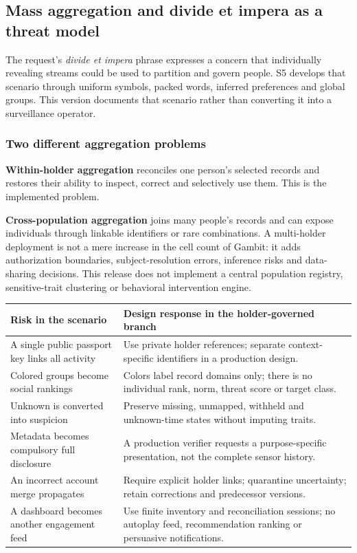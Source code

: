 \documentclass[11pt,a4paper]{article}
\newcommand{\newpagehead}[1]{\clearpage\subsection{#1}}
\begin{document}
\newpagehead{Mass aggregation and divide et impera as a threat model}
The request's \emph{divide et impera} phrase expresses a concern that individually revealing streams could be used to partition and govern people. S5 develops that scenario through uniform symbols, packed words, inferred preferences and global groups. This version documents that scenario rather than converting it into a surveillance operator.

\subsubsection{Two different aggregation problems}
\textbf{Within-holder aggregation} reconciles one person's selected records and restores their ability to inspect, correct and selectively use them. This is the implemented problem.

\textbf{Cross-population aggregation} joins many people's records and can expose individuals through linkable identifiers or rare combinations. A multi-holder deployment is not a mere increase in the cell count of Gambit: it adds authorization boundaries, subject-resolution errors, inference risks and data-sharing decisions. This release does not implement a central population registry, sensitive-trait clustering or behavioral intervention engine.

\begin{center}\small\begin{tabularx}{\textwidth}{@{}p{}X@{}}\toprule
\textbf{Risk in the scenario} & \textbf{Design response in the holder-governed branch}\\\midrule
A single public passport key links all activity & Use private holder references; separate context-specific identifiers in a production design.\\[7pt]
Colored groups become social rankings & Colors label record domains only; there is no individual rank, norm, threat score or target class.\\[7pt]
Unknown is converted into suspicion & Preserve missing, unmapped, withheld and unknown-time states without imputing traits.\\[7pt]
Metadata becomes compulsory full disclosure & A production verifier requests a purpose-specific presentation, not the complete sensor history.\\[7pt]
An incorrect account merge propagates & Require explicit holder links; quarantine uncertainty; retain corrections and predecessor versions.\\[7pt]
A dashboard becomes another engagement feed & Use finite inventory and reconciliation sessions; no autoplay feed, recommendation ranking or persuasive notifications.\\\bottomrule
\end{tabularx}\end{center}
\end{document}
